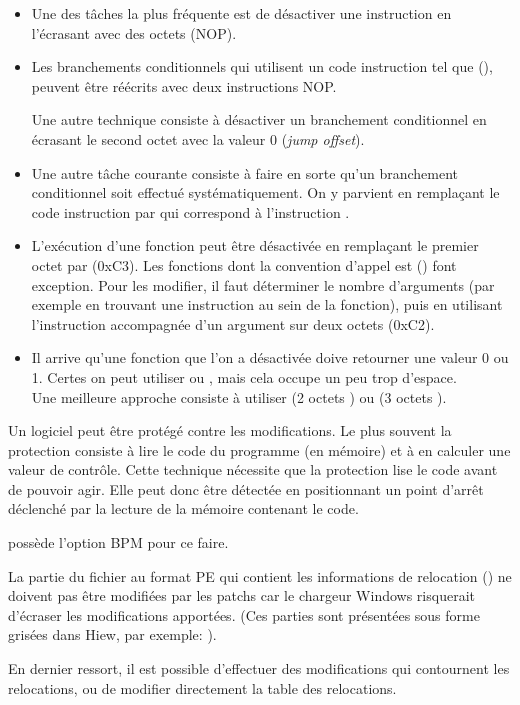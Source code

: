 \begin{itemize}

\item Une des tâches la plus fréquente est de désactiver une instruction en l'écrasant
avec des octets  (\ac{NOP}).

\item Les branchements conditionnels qui utilisent un code instruction tel que  (\JZ), 
peuvent être réécrits avec deux instructions \ac{NOP}.

Une autre technique consiste à désactiver un branchement conditionnel en écrasant le second octet 
avec la valeur 0 (\emph{jump offset}).

\item 
Une autre tâche courante consiste à faire en sorte qu'un branchement conditionnel soit effectué 
systématiquement. On y parvient en remplaçant le code instruction par  qui correspond à 
l'instruction \JMP.

\item L'exécution d'une fonction peut être désactivée en remplaçant le premier octet par \RETN (0xC3).
Les fonctions dont la convention d'appel est  () font exception. 
Pour les modifier, il faut déterminer le nombre d'arguments (par exemple en trouvant une instruction 
\RETN au sein de la fonction), puis en utilisant l'instruction \RETN accompagnée d'un argument sur 
deux octets (0xC2).

\item Il arrive qu'une fonction que l'on a désactivée doive retourner une valeur 0 ou 1. Certes on 
peut utiliser  ou , mais cela occupe un peu trop d'espace.\\
Une meilleure approche consiste à utiliser  (2 octets ) ou 
 (3 octets ).

\end{itemize}

Un logiciel peut être protégé contre les modifications. Le plus souvent la protection consiste à 
lire le code du programme (en mémoire) et à en calculer une valeur de contrôle.
Cette technique nécessite que la protection lise le code avant de pouvoir agir. Elle peut donc être 
détectée en positionnant un point d'arrêt déclenché par la lecture de la mémoire contenant le code.

\tracer possède l'option BPM pour ce faire.

La partie du fichier au format PE qui contient les informations de relocation () 
ne doivent pas être modifiées par les patchs car le chargeur Windows risquerait d'écraser les 
modifications apportées.
(Ces parties sont présentées sous forme grisées dans Hiew, par exemple:
).

En dernier ressort, il est possible d'effectuer des modifications qui contournent les relocations, 
ou de modifier directement la table des relocations.
